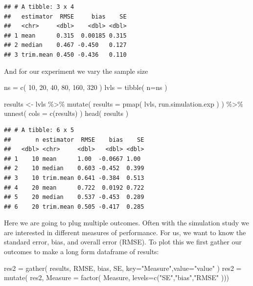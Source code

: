 \documentclass[
]{book}
\newenvironment{Shaded}{\begin{snugshade}}{\end{snugshade}}
\newcommand{\AttributeTok}[1]{\textcolor[rgb]{0.77,0.63,0.00}{#1}}
\newcommand{\DecValTok}[1]{\textcolor[rgb]{0.00,0.00,0.81}{#1}}
\newcommand{\FunctionTok}[1]{\textcolor[rgb]{0.00,0.00,0.00}{#1}}
\newcommand{\NormalTok}[1]{#1}
\newcommand{\OtherTok}[1]{\textcolor[rgb]{0.56,0.35,0.01}{#1}}
\newcommand{\SpecialCharTok}[1]{\textcolor[rgb]{0.00,0.00,0.00}{#1}}
\newcommand{\StringTok}[1]{\textcolor[rgb]{0.31,0.60,0.02}{#1}}
\begin{document}
\begin{verbatim}
## # A tibble: 3 x 4
##   estimator  RMSE     bias    SE
##   <chr>     <dbl>    <dbl> <dbl>
## 1 mean      0.315  0.00185 0.315
## 2 median    0.467 -0.450   0.127
## 3 trim.mean 0.450 -0.436   0.110
\end{verbatim}

And for our experiment we vary the sample size

\begin{Shaded}
\begin{Highlighting}[]
\NormalTok{ns }\OtherTok{=} \FunctionTok{c}\NormalTok{( }\DecValTok{10}\NormalTok{, }\DecValTok{20}\NormalTok{, }\DecValTok{40}\NormalTok{, }\DecValTok{80}\NormalTok{, }\DecValTok{160}\NormalTok{, }\DecValTok{320}\NormalTok{ )}
\NormalTok{lvls }\OtherTok{=} \FunctionTok{tibble}\NormalTok{( }\AttributeTok{n=}\NormalTok{ns )}
\end{Highlighting}
\end{Shaded}

\begin{Shaded}
\begin{Highlighting}[]
\NormalTok{results }\OtherTok{\textless{}{-}}\NormalTok{ lvls }\SpecialCharTok{\%\textgreater{}\%} 
  \FunctionTok{mutate}\NormalTok{( }\AttributeTok{results =} \FunctionTok{pmap}\NormalTok{( lvls, run.simulation.exp ) ) }\SpecialCharTok{\%\textgreater{}\%} 
  \FunctionTok{unnest}\NormalTok{( }\AttributeTok{cols =} \FunctionTok{c}\NormalTok{(results) )}
\FunctionTok{head}\NormalTok{( results )}
\end{Highlighting}
\end{Shaded}

\begin{verbatim}
## # A tibble: 6 x 5
##       n estimator  RMSE    bias    SE
##   <dbl> <chr>     <dbl>   <dbl> <dbl>
## 1    10 mean      1.00  -0.0667 1.00 
## 2    10 median    0.603 -0.452  0.399
## 3    10 trim.mean 0.641 -0.384  0.513
## 4    20 mean      0.722  0.0192 0.722
## 5    20 median    0.537 -0.453  0.289
## 6    20 trim.mean 0.505 -0.417  0.285
\end{verbatim}

Here we are going to plug multiple outcomes. Often with the simulation study
we are interested in different measures of performance. For us, we want to
know the standard error, bias, and overall error (RMSE). To plot this we
first gather our outcomes to make a long form dataframe of results:

\begin{Shaded}
\begin{Highlighting}[]
\NormalTok{res2 }\OtherTok{=} \FunctionTok{gather}\NormalTok{( results, RMSE, bias, SE, }\AttributeTok{key=}\StringTok{"Measure"}\NormalTok{,}\AttributeTok{value=}\StringTok{"value"}\NormalTok{ )}
\NormalTok{res2 }\OtherTok{=} \FunctionTok{mutate}\NormalTok{( res2, }\AttributeTok{Measure =} \FunctionTok{factor}\NormalTok{( Measure, }\AttributeTok{levels=}\FunctionTok{c}\NormalTok{(}\StringTok{"SE"}\NormalTok{,}\StringTok{"bias"}\NormalTok{,}\StringTok{"RMSE"}\NormalTok{ )))}
\end{Highlighting}
\end{Shaded}
\end{document}
